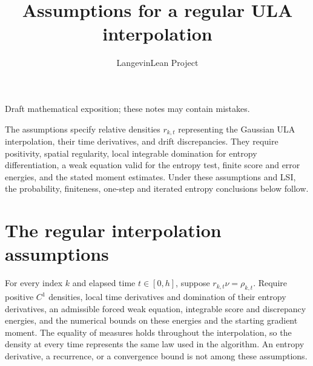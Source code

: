 \documentclass[11pt,a4paper]{article}
\title{\texorpdfstring{Assumptions for a regular ULA interpolation}{Assumptions for a regular ULA interpolation}}
\author{LangevinLean Project}
\date{}
\begin{document}
\maketitle
Draft mathematical exposition; these notes may contain mistakes.


The assumptions specify relative densities \(r_{k,t}\) representing the Gaussian ULA interpolation, their time derivatives, and drift discrepancies. They require positivity, spatial regularity, local integrable domination for entropy differentiation, a weak equation valid for the entropy test, finite score and error energies, and the stated moment estimates. Under these assumptions and LSI, the probability, finiteness, one-step and iterated entropy conclusions below follow.


\section{\texorpdfstring{The regular interpolation assumptions}{The regular interpolation assumptions}}


For every index \(k\) and elapsed time \(t\in[0,h]\), suppose \(r_{k,t}\nu=\rho_{k,t}\). Require positive \(C^1\) densities, local time derivatives and domination of their entropy derivatives, an admissible forced weak equation, integrable score and discrepancy energies, and the numerical bounds on these energies and the starting gradient moment. The equality of measures holds throughout the interpolation, so the density at every time represents the same law used in the algorithm. An entropy derivative, a recurrence, or a convergence bound is not among these assumptions.
\end{document}

